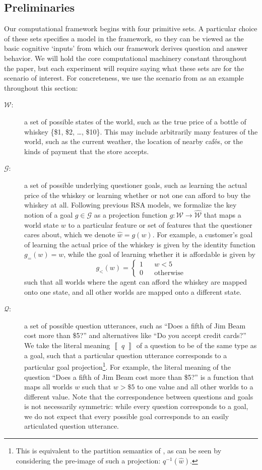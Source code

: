 \documentclass[11pt, floatsintext]{apa6}
\newcommand{\den}[2][]{
\(
\left\llbracket\;\text{#2}\;\right\rrbracket^{#1}
\)
}
\begin{document}
\label{sec:model}

\subsection{Preliminaries}

Our computational framework begins with four primitive sets. 
A particular choice of these sets specifies a model in the framework, so they can be viewed as the basic cognitive `inputs' from which our framework derives question and answer behavior. 
We will hold the core computational machinery constant throughout the paper, but each experiment will require saying what these sets are for  the scenario of interest.
For concreteness, we use the scenario from  as an example throughout this section: 
\begin{description}
\item[$\mathcal{W}$:] a set of possible states of the world, such as the true price of a bottle of whiskey \{\$1, \$2, \dots, \$10\}. This may include arbitrarily many features of the world, such as the current weather, the location of nearby caf\'es, or the kinds of payment that the store accepts.
\item[$\mathcal{G}$:] a set of possible underlying questioner goals, such as learning the actual price of the whiskey or learning whether or not one can afford to buy the whiskey at all. 
Following previous RSA models, we formalize the key notion of a goal $g \in \mathcal{G}$ as a projection function $g: \mathcal{W} \rightarrow \widehat{\mathcal{W}}$ that maps a world state $w$ to a particular feature or set of features that the questioner cares about, which we denote $\widehat{w} = g(w)$. 
For example, a customer's goal of learning the actual price of the whiskey is given by the identity function $g_{=}(w) = w$, while the goal of learning whether it is affordable is given by 
$$g_{<}(w) = \left\{\begin{array}{rcl}
1 & & w < 5 \\
0 & & \textrm{otherwise}
\end{array}\right.$$
such that all worlds where the agent can afford the whiskey are mapped onto one state, and all other worlds are mapped onto a different state.
\item[$\mathcal{Q}$:] a set of possible question utterances, such as ``Does a fifth of Jim Beam cost more than \$5?'' and alternatives like ``Do you accept credit cards?'' We take the literal meaning \den{$q$} of a question to be of the same type as a goal, such that a particular question utterance corresponds to a particular goal projection\footnote{This is equivalent to the partition semantics of , as can be seen by considering the pre-image of such a projection: $q^{-1}(\hat{w})$.}. For example, the literal meaning of the question ``Does a fifth of Jim Beam cost more than \$5?'' is a function that maps all worlds $w$ such that $w > \$5$ to one value and all other worlds to a different value. Note that the correspondence between questions and goals is not necessarily symmetric: while every question corresponds to a goal, we do not expect that every possible goal corresponds to an easily articulated question utterance.

\end{description}
\end{document}
